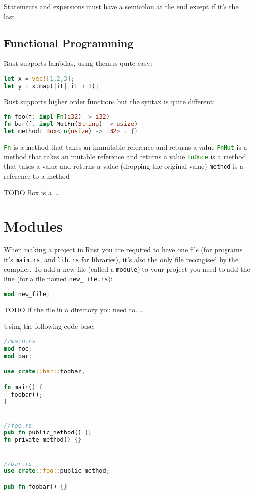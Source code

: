 \documentclass[a4paper,11pt]{article}
\begin{document}
Statements and expersions must have a semicolon at the end except if it's the last

\subsection{Functional Programming}

Rust supports lambdas, using them is quite easy:

\begin{lstlisting}[language=Rust,frame=single]
let x = vec![1,2,3]; 
let y = x.map(|it| it + 1);
\end{lstlisting}

Rust supports higher order functions but the syntax is quite different:
\begin{lstlisting}[language=Rust,frame=single]
fn foo(f: impl Fn(i32) -> i32)
fn bar(f: impl MutFn(String) -> usize)
let method: Box<Fn(usize) -> i32> = {}
\end{lstlisting}

\lstinline[language=Rust]{Fn} is a method that takes an immutable reference and returns a value
\newline
\lstinline[language=Rust]{FnMut} is a method that takes an mutable reference and returns a value
\newline
\lstinline[language=Rust]{FnOnce} is a method that takes a value and returns a value (dropping the original value)
\newline
\lstinline{method} is a reference to a method

TODO
Box is a ...

\newpage
\section{Modules}
When making a project in Rust you are required to have one file (for programs it's \lstinline{main.rs}, and \lstinline{lib.rs} for libraries), it's also the only file recongised by the compiler. To add a new file (called a \lstinline{module}) to your project you need to add the line (for a file named \lstinline{new_file.rs}):
\begin{lstlisting}[language=Rust,frame=single]
mod new_file;
\end{lstlisting}

TODO
If the file in a directory you need to....

Using the following code base:
\begin{lstlisting}[language=Rust,frame=single]
//main.rs 
mod foo;
mod bar;

use crate::bar::foobar;

fn main() {
  foobar();
}


//foo.rs
pub fn public_method() {}
fn private_method() {}


//bar.rs
use crate::foo::public_method;

pub fn foobar() {}
\end{lstlisting}
\end{document}
